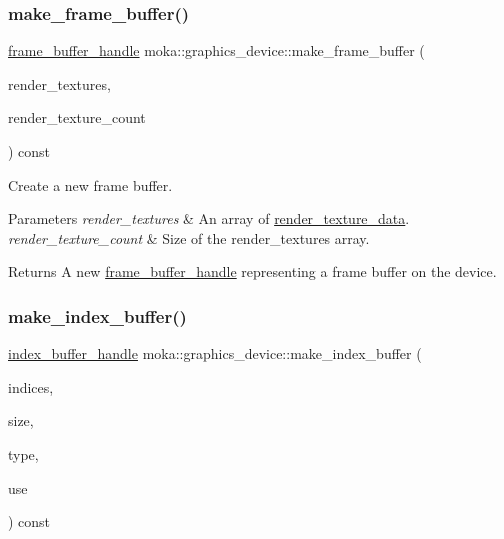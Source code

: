 \subsubsection{\texorpdfstring{make\_frame\_buffer()}{make\_frame\_buffer()}}
{\footnotesize\ttfamily \mbox{\hyperlink{structmoka_1_1frame__buffer__handle}{frame\+\_\+buffer\+\_\+handle}} moka\+::graphics\+\_\+device\+::make\+\_\+frame\+\_\+buffer (\begin{DoxyParamCaption}\item[{\mbox{\hyperlink{structmoka_1_1render__texture__data}{render\+\_\+texture\+\_\+data}} $\ast$}]{render\+\_\+textures,  }\item[{size\+\_\+t}]{render\+\_\+texture\+\_\+count }\end{DoxyParamCaption}) const}



Create a new frame buffer. 


\begin{DoxyParams}{Parameters}
{\em render\+\_\+textures} & An array of \mbox{\hyperlink{structmoka_1_1render__texture__data}{render\+\_\+texture\+\_\+data}}. \\
\hline
{\em render\+\_\+texture\+\_\+count} & Size of the render\+\_\+textures array. \\
\hline
\end{DoxyParams}
\begin{DoxyReturn}{Returns}
A new \mbox{\hyperlink{structmoka_1_1frame__buffer__handle}{frame\+\_\+buffer\+\_\+handle}} representing a frame buffer on the device. 
\end{DoxyReturn}
\mbox{\label{classmoka_1_1graphics__device_a5756933e283104ae19a8c87f970bdc80}} 
\subsubsection{\texorpdfstring{make\_index\_buffer()}{make\_index\_buffer()}}
{\footnotesize\ttfamily \mbox{\hyperlink{structmoka_1_1index__buffer__handle}{index\+\_\+buffer\+\_\+handle}} moka\+::graphics\+\_\+device\+::make\+\_\+index\+\_\+buffer (\begin{DoxyParamCaption}\item[{const void $\ast$}]{indices,  }\item[{size\+\_\+t}]{size,  }\item[{\mbox{\hyperlink{namespacemoka_a32244b0de63481283738e2db11639e3f}{index\+\_\+type}}}]{type,  }\item[{\mbox{\hyperlink{namespacemoka_a4799e695da8b173f75809387af8abed7}{buffer\+\_\+usage}}}]{use }\end{DoxyParamCaption}) const}



